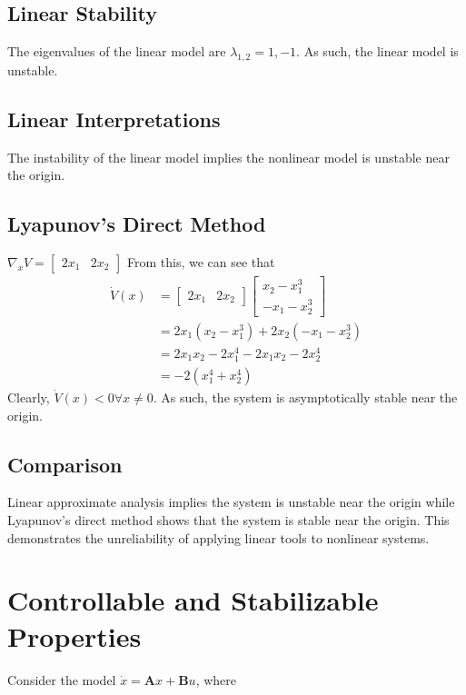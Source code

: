 \documentclass[]{article}
\begin{document}
\subsection{Linear Stability}
The eigenvalues of the linear model are $\lambda_{1,2} = 1, -1$.
As such, the linear model is unstable.

\subsection{Linear Interpretations}
The instability of the linear model implies the nonlinear model is unstable near the origin.

\subsection{Lyapunov's Direct Method}

$\nabla_xV = \begin{bmatrix}
2x_1 & 2x_2
\end{bmatrix}$
From this, we can see that 
\begin{align*}
	\dot{V}(x) &= \begin{bmatrix}
	2x_1 & 2x_2
	\end{bmatrix}\begin{bmatrix}
	x_2 - x_1^3 \\
	-x_1 - x_2^3
	\end{bmatrix} \\
	&= 2x_1(x_2 - x_1^3) + 2x_2(-x_1 - x_2^3) \\
	&= 2x_1x_2 - 2x_1^4 - 2x_1x_2 - 2x_2^4 \\
	&= -2(x_1^4 + x_2^4)
\end{align*}
Clearly, $\dot{V}(x) < 0 \forall x \ne 0$.
As such, the system is asymptotically stable near the origin.

\subsection{Comparison}
Linear approximate analysis implies the system is unstable near the origin while Lyapunov's direct method shows that the system is stable near the origin.
This demonstrates the unreliability of applying linear tools to nonlinear systems.


\section{Controllable and Stabilizable Properties}

Consider the model $\dot{x} = \mathbf{A}x + \mathbf{B}u$, where
\end{document}

